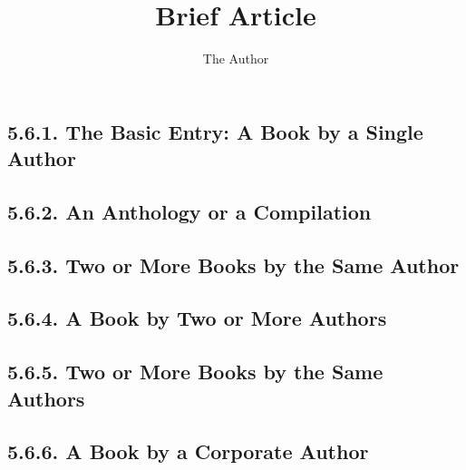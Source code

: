 \documentclass[12pt]{article}
\title{Brief Article}
\author{The Author}
\begin{document}
\subsection*{5.6.1. The Basic Entry: A Book by a Single Author}
\newrefsegment \nocite{fukuyama02aa,berlage94aa,freedman84aa,kurlansky02aa,lecarre01aa,rowling00aa,silver97aa,tatar92aa}

\printbibliography[heading=blank,segment=1]



\subsection*{5.6.2. An Anthology or a Compilation}
\newrefsegment \nocite{lopate94aa,sevillano86aa,spafford92aa,weisser01aa}

\printbibliography[heading=blank,segment=2]


\subsection*{5.6.3. Two or More Books by the Same Author}
\newrefsegment \nocite{borroff63aa,borroff67aa,borroff79aa,frye57aa,frye62aa,frye91aa,frye57ab}

\printbibliography[heading=blank,segment=3]


\subsection*{5.6.4. A Book by Two or More Authors}
\newrefsegment \nocite{eggins97aa,hutcheon00aa,gilman93aa,gilman93ab,quirk85aa,quirk85ab,marquart94aa,rabkin83aa}

\printbibliography[heading=blank,segment=4]


\subsection*{5.6.5. Two or More Books by the Same Authors}
\newrefsegment \nocite{durant65aa,durant77aa,gilbert95aa,gilbert01aa,gilbert79aa}

\printbibliography[heading=blank,segment=5]


\subsection*{5.6.6. A Book by a Corporate Author}
\newrefsegment 
\nocite{american-medical-association89aa,national-research-council00aa,public-agenda-foundation92aa}
\end{document}
